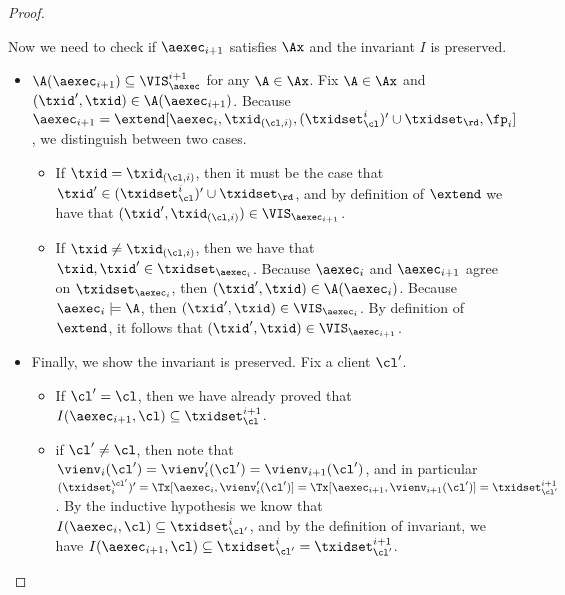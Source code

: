 \begin{proof}
\begin{itemize}
Now we need to check if \( \aexec_{i+1} \) satisfies \( \Ax\) and the invariant \( I \) is preserved.
\begin{itemize}
\item $\A(\aexec_{i+1}) \subseteq \VIS_{\aexec}^{i+1}$ for any $\A \in \Ax$.
Fix $\A \in \Ax$ and $(\txid', \txid) \in \A(\aexec_{i+1})$. 
Because $\aexec_{i+1} = \extend[\aexec_{i}, \txid_{(\cl, i)}, (\txidset_{\cl}^{i})' \cup \txidset_\rd, \fp_{i}]$, 
we distinguish between two cases.
\begin{itemize}
\item If $\txid = \txid_{(\cl, i)}$, then it must be the case that $\txid' \in (\txidset^{i}_{\cl})' \cup \txidset_\rd$, 
and by definition of $\extend$ we have that $(\txid' ,\txid_{(\cl, i)}) \in \VIS_{\aexec_{i+1}}$. 
\item If $\txid \neq \txid_{(\cl, i)}$, then we have that $\txid, \txid' \in \txidset_{\aexec_{i}}$. 
Because $\aexec_{i}$ and $\aexec_{i+1}$ agree on $\txidset_{\aexec_{i}}$, then $(\txid', \txid) \in \A(\aexec_{i})$.
Because $\aexec_{i} \models \A$, then $(\txid', \txid) \in \VIS_{\aexec_{i}}$. 
By definition of $\extend$, it follows that $(\txid', \txid) \in \VIS_{\aexec_{i+1}}$.
\end{itemize}

\item Finally, we show the invariant is preserved.
Fix a client $\cl'$. 
\begin{itemize}
\item If $\cl' = \cl$, then we have already proved that 
$I(\aexec_{i+1}, \cl) \subseteq \txidset_{\cl}^{i+1}$. 
\item if $\cl' \neq \cl$, then note that $\vienv_{i}(\cl') = \vienv'_{i}(\cl') = \vienv_{i+1}(\cl')$, 
and in particular $(\txidset^{\cl'}_{i})' = \Tx[\aexec_{i}, \vienv'_{i}(\cl')] = \Tx[\aexec_{i+1}, \vienv_{i+1}(\cl')] =  \txidset_{\cl'}^{i+1}$.
By the inductive hypothesis we know that $I(\aexec_{i}, \cl) \subseteq \txidset_{\cl'}^{i}$, 
and by the definition of invariant, we have $I(\aexec_{i+1}, \cl) \subseteq \txidset_{\cl'}^{i} = \txidset_{\cl'}^{i+1}$. 
\end{itemize}
\end{itemize}
\end{itemize}
\end{proof}

